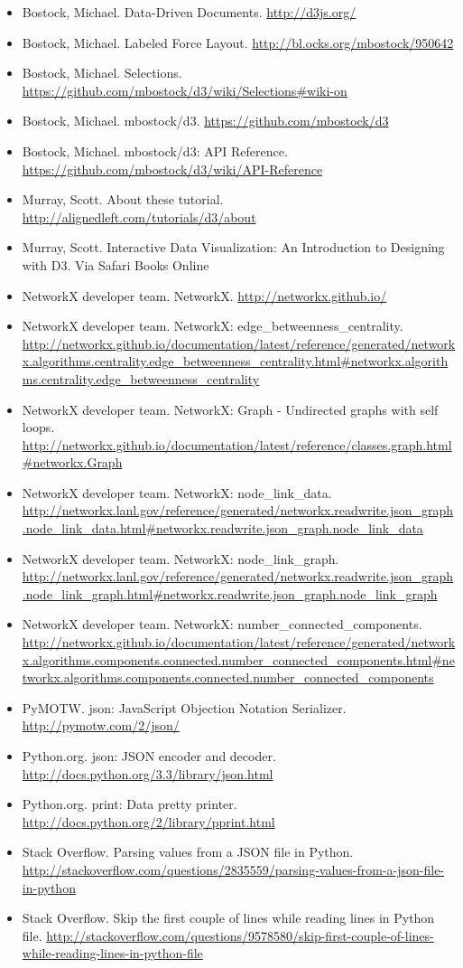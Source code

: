 \documentclass{article}
\begin{document}
\begin{itemize}
\item Bostock, Michael. Data-Driven Documents. \url{http://d3js.org/}
\item Bostock, Michael. Labeled Force Layout. \url{http://bl.ocks.org/mbostock/950642}
\item Bostock, Michael. Selections. \url{https://github.com/mbostock/d3/wiki/Selections#wiki-on}
\item Bostock, Michael. mbostock/d3. \url{https://github.com/mbostock/d3}
\item Bostock, Michael. mbostock/d3: API Reference. \url{https://github.com/mbostock/d3/wiki/API-Reference}
\item Murray, Scott. About these tutorial. \url{http://alignedleft.com/tutorials/d3/about}
\item Murray, Scott. Interactive Data Visualization: An Introduction to Designing with D3. Via Safari Books Online
\item NetworkX developer team. NetworkX. \url{http://networkx.github.io/}
\item NetworkX developer team. NetworkX: edge\_betweenness\_centrality. \url{http://networkx.github.io/documentation/latest/reference/generated/networkx.algorithms.centrality.edge_betweenness_centrality.html#networkx.algorithms.centrality.edge_betweenness_centrality}
\item NetworkX developer team. NetworkX: Graph - Undirected graphs with self loops. \url{http://networkx.github.io/documentation/latest/reference/classes.graph.html#networkx.Graph}
\item NetworkX developer team. NetworkX: node\_link\_data. \url{http://networkx.lanl.gov/reference/generated/networkx.readwrite.json_graph.node_link_data.html#networkx.readwrite.json_graph.node_link_data}
\item NetworkX developer team. NetworkX: node\_link\_graph. \url{http://networkx.lanl.gov/reference/generated/networkx.readwrite.json_graph.node_link_graph.html#networkx.readwrite.json_graph.node_link_graph}
\item NetworkX developer team. NetworkX: number\_connected\_components. \url{http://networkx.github.io/documentation/latest/reference/generated/networkx.algorithms.components.connected.number_connected_components.html#networkx.algorithms.components.connected.number_connected_components}
\item PyMOTW. json: JavaScript Objection Notation Serializer. \url{http://pymotw.com/2/json/}
\item Python.org. json: JSON encoder and decoder. \url{http://docs.python.org/3.3/library/json.html}
\item Python.org. print: Data pretty printer. \url{http://docs.python.org/2/library/pprint.html}
\item Stack Overflow. Parsing values from a JSON file in Python. \url{http://stackoverflow.com/questions/2835559/parsing-values-from-a-json-file-in-python}
\item Stack Overflow. Skip the first couple of lines while reading lines in Python file. \url{http://stackoverflow.com/questions/9578580/skip-first-couple-of-lines-while-reading-lines-in-python-file}



\end{itemize}
\end{document}
